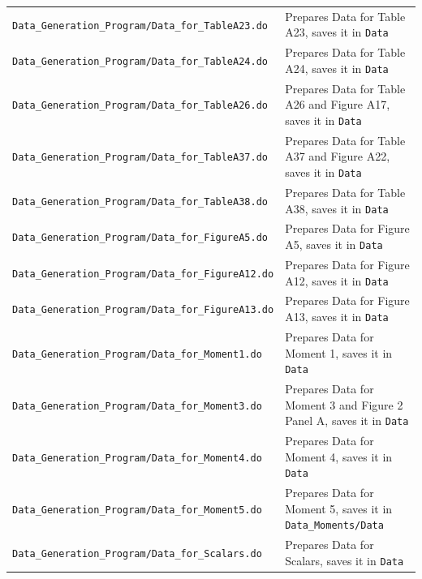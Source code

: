 \documentclass[12pt,notitlepage]{article}
\begin{document}
\begin{table}
{\begin{tabular}{ll}
\texttt{Data\_Generation\_Program/Data\_for\_TableA23.do} & Prepares Data for Table A23, saves it in \texttt{Data} \\
\texttt{Data\_Generation\_Program/Data\_for\_TableA24.do} & Prepares Data for Table A24, saves it in \texttt{Data} \\
\texttt{Data\_Generation\_Program/Data\_for\_TableA26.do} & Prepares Data for Table A26 and Figure A17, saves it in \texttt{Data} \\
\texttt{Data\_Generation\_Program/Data\_for\_TableA37.do} & Prepares Data for Table A37 and Figure A22, saves it in \texttt{Data} \\
\texttt{Data\_Generation\_Program/Data\_for\_TableA38.do} & Prepares Data for Table A38, saves it in \texttt{Data} \\

\texttt{Data\_Generation\_Program/Data\_for\_FigureA5.do} & Prepares Data for Figure A5, saves it in \texttt{Data} \\
\texttt{Data\_Generation\_Program/Data\_for\_FigureA12.do} & Prepares Data for Figure A12, saves it in \texttt{Data} \\
\texttt{Data\_Generation\_Program/Data\_for\_FigureA13.do} & Prepares Data for Figure A13, saves it in \texttt{Data} \\


\texttt{Data\_Generation\_Program/Data\_for\_Moment1.do} & Prepares Data for Moment 1, saves it in \texttt{Data} \\
\texttt{Data\_Generation\_Program/Data\_for\_Moment3.do} & Prepares Data for Moment 3 and Figure 2 Panel A, saves it in \texttt{Data} \\
\texttt{Data\_Generation\_Program/Data\_for\_Moment4.do} & Prepares Data for Moment 4, saves it in \texttt{Data} \\
\texttt{Data\_Generation\_Program/Data\_for\_Moment5.do} & Prepares Data for Moment 5, saves it in \texttt{Data\_Moments/Data} \\
\texttt{Data\_Generation\_Program/Data\_for\_Scalars.do} & Prepares Data for Scalars, saves it in \texttt{Data} \\
\bottomrule
\end{tabular}
}
\end{table}
\end{document}
